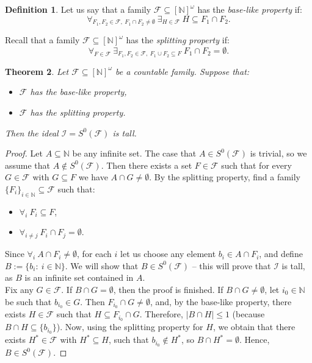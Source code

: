 \documentclass{amsart}
\newtheorem{thm}{Theorem}[section]
\theoremstyle{definition}
\newtheorem{df}[thm]{Definition}
\newcommand{\N}{{\mathbb N}}
\newcommand{\I}{\mathcal I}
\newcommand{\InfSubs}{[\N]^{\omega}}
\newcommand{\MB}{S^0}
\begin{document}
\begin{df}
Let us say that a family $\mathcal{F}\subseteq \InfSubs$ has the \emph{base-like property} if:
$$\forall_{F_1, F_2\in\mathcal{F},\ F_1\cap F_2\neq\emptyset}\ \exists_{H\in\mathcal{F}}\ H\subseteq F_1\cap F_2.$$
\end{df}

Recall that a family $\mathcal{F} \subseteq \InfSubs$ has the \emph{splitting property} if: 
$$\forall_{F\in\mathcal{F}}\ \exists_{F_1,F_2\in\mathcal{F},\ F_1\cup F_2 \subseteq F}\ F_1\cap F_2 = \emptyset.$$

\begin{thm} \label{thmtall}
Let $\mathcal{F}\subseteq \InfSubs$ be a countable family. Suppose that: 
\begin{itemize}
	\item[$(i)$] $\mathcal{F}$ has the base-like property,
	\item[$(ii)$] $\mathcal{F}$ has the splitting property.
\end{itemize}
Then the ideal $\I=\MB(\mathcal{F})$ is tall.
\end{thm}

\begin{proof}
Let $A \subseteq\N$ be any infinite set. 
The case that $A\in \MB(\mathcal{F})$ is trivial, 
so we assume that $A\notin \MB(\mathcal{F})$. Then there exists a set $F\in\mathcal{F}$ such that for every $G\in\mathcal{F}$ with $G\subseteq F$ we have $A\cap G \neq\emptyset$. By the splitting property, find a family $\{F_i\}_{i\in\N} \subseteq\mathcal{F}$ such that:
\begin{itemize}
\item $\forall_{i}\ F_i \subseteq F$,
\item $\forall_{i\neq j}\ F_i\cap F_j =\emptyset$.
\end{itemize}
Since $\forall_{i}\ A\cap F_i \neq\emptyset$, for each $i$ let us choose any element $b_i \in A\cap F_i$, and define $B:=\{b_i :\ i\in\N\}$. We will show that $B\in\MB(\mathcal{F})$ -- this will prove that $\I$ is tall, as $B$ is an infinite set contained in $A$.\\
Fix any $G\in \mathcal{F}$. If $B\cap G=\emptyset$, then the proof is finished. If $B\cap G \neq\emptyset$, let $i_0\in\N$ be such that $b_{i_0}\in G$. Then $F_{i_0}\cap G \neq\emptyset$, and, by the base-like property, there exists $H\in\mathcal{F}$ such that $H\subseteq F_{i_0}\cap G$. Therefore, $|B\cap H|\leq 1$ (because $B\cap H\subseteq\{b_{i_0}\}$). Now, using the splitting property for $H$, we obtain that there exists $H^*\in\mathcal{F}$ with $H^*\subseteq H$, such that $b_{i_0}\notin H^*$, so $B\cap H^* =\emptyset$. Hence, $B\in\MB(\mathcal{F})$.
\end{proof}
\end{document}
